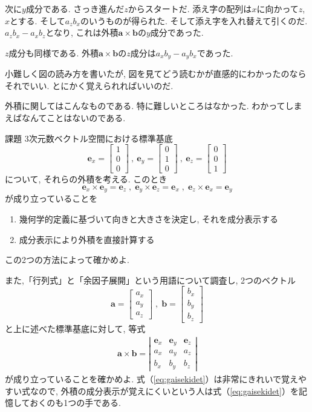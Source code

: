 次に$y$成分である. さっき進んだ$z$からスタートだ. 添え字の配列は$x$に向かって$z$, $x$とする. 
そして$a_z b_x$のいうものが得られた. 
そして添え字を入れ替えて引くのだ. $a_z b_x - a_x b_z$となり, これは外積$\bm{a} \times \bm{b}$の$y$成分であった. 

$z$成分も同様である. 外積$\bm{a} \times \bm{b}$の$z$成分は$a_x b_y - a_y b_x$であった. 

小難しく図の読み方を書いたが, 図を見てどう読むかが直感的にわかったのならそれでいい. とにかく覚えられればいいのだ. 

外積に関してはこんなものである. 特に難しいところはなかった. わかってしまえばなんてことはないのである. 
\begin{itembox}[l]{課題}
3次元数ベクトル空間における標準基底
$$
\bm{e}_x = \left[
 \begin{array}{c}
 1 \\
 0 \\
 0 
 \end{array}
\right]
\: , \: 
\bm{e}_y = \left[
 \begin{array}{c}
 0 \\
 1 \\
 0 
 \end{array}
\right]
\: , \: 
\bm{e}_z = \left[
 \begin{array}{c}
 0 \\
 0 \\
 1 
 \end{array}
\right]
$$
について, それらの外積を考える. このとき
$$
\bm{e}_x \times \bm{e}_y = \bm{e}_z \; , \; 
\bm{e}_y \times \bm{e}_z = \bm{e}_x \; , \; 
\bm{e}_z \times \bm{e}_x = \bm{e}_y 
$$
が成り立っていることを
\begin{enumerate}
\item 幾何学的定義に基づいて向きと大きさを決定し, それを成分表示する
\item 成分表示により外積を直接計算する 
\end{enumerate}
この2つの方法によって確かめよ. 

また,「行列式」と「余因子展開」という用語について調査し, 2つのベクトル
$$
\bm{a} = \left[
 \begin{array}{c}
  a_x \\ 
  a_y \\
  a_z
 \end{array}
\right]
\; , \; 
\bm{b} = \left[
 \begin{array}{c}
  b_x \\ 
  b_y \\
  b_z
 \end{array}
\right]
$$
と上に述べた標準基底に対して, 等式
\begin{eqnarray}
\bm{a} \times \bm{b} = \left| 
\begin{array}{ccc}
 \bm{e}_x & \bm{e}_y & \bm{e}_z \\
 a_x & a_y & a_z \\
 b_x & b_y & b_z 
\end{array}
\right|
\label{eq:gaisekidet}
\end{eqnarray}
が成り立っていることを確かめよ. 式（\ref{eq:gaisekidet}）は非常にきれいで覚えやすい式なので, 
外積の成分表示が覚えにくいという人は式（\ref{eq:gaisekidet}）を記憶しておくのも1つの手である. 


\end{itembox}
